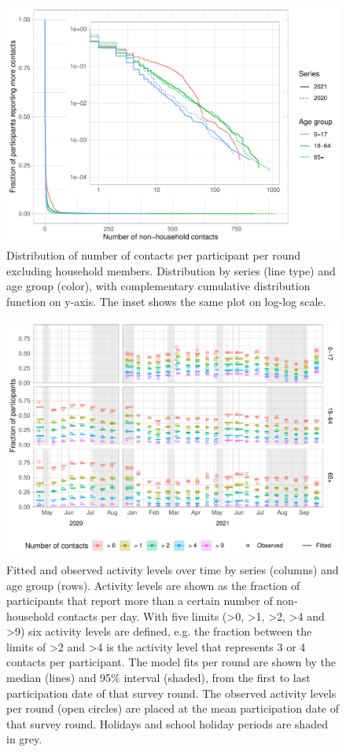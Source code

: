 \documentclass[fleqn,10pt]{wlscirep}
\begin{document}
\begin{figure}[ht]
\centering
\includegraphics[width=\linewidth]{../figures/distribution_contacts.pdf}
\caption{Distribution of number of contacts per participant per round excluding household members. Distribution by series (line type) and age group (color), with complementary cumulative distribution function on y-axis. The inset shows the same plot on log-log scale.}
\label{fig:powerlaw}
\end{figure}

\clearpage

\begin{figure}[ht]
\centering
\includegraphics[width=\linewidth]{../figures/fit_studypopulation_cat6.pdf}
\caption{Fitted and observed activity levels over time by series (columns) and age group (rows). Activity levels are shown as the fraction of participants that report more than a certain number of non-household contacts per day. With five limits (>0, >1, >2, >4 and >9) six activity levels are defined, e.g. the fraction between the limits of >2 and >4 is the activity level that represents 3 or 4 contacts per participant. The model fits per round are shown by the median (lines) and 95\% interval (shaded), from the first to last participation date of that survey round. The observed activity levels per round (open circles) are placed at the mean participation date of that survey round. Holidays and school holiday periods are shaded in grey.}
\label{fig:studypop}
\end{figure}
\end{document}
